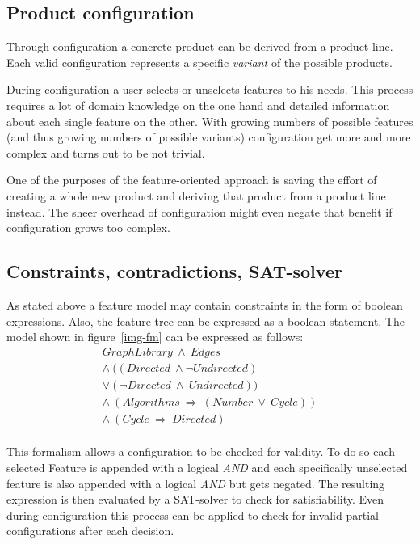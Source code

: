 \subsection{Product configuration}
Through configuration a concrete product can be derived from a product line. Each valid configuration represents a specific \textit{variant} of the possible products.

During configuration a user selects or unselects features to his needs. This process requires a lot of domain knowledge on the one hand and detailed information about each single feature on the other. With growing numbers of possible features (and thus growing numbers of possible variants) configuration get more and more complex and turns out to be not trivial.

One of the purposes of the feature-oriented approach is saving the effort of creating a whole new product and deriving that product from a product line instead. The sheer overhead of configuration might even negate that benefit if configuration grows too complex.

\subsection{Constraints, contradictions, SAT-solver}
As stated above a feature model may contain constraints in the form of boolean expressions. Also, the feature-tree can be expressed as a boolean statement. The model shown in figure~\ref{img-fm} can be expressed as follows:
\begin{equation}
\begin{split}
	GraphLibrary\ \wedge\ Edges\\
	\wedge\ ((Directed\ \wedge \neg Undirected)\\
	\vee (\neg Directed\ \wedge\ Undirected))\\
	\wedge\ (Algorithms\ \Rightarrow\ (Number\ \vee\ Cycle))\\
	\wedge\ (Cycle\ \Rightarrow\ Directed)
\end{split}
\end{equation}\\
This formalism allows a configuration to be checked for validity. To do so each selected Feature is appended with a logical \textit{AND} and each specifically unselected feature is also appended with a logical \textit{AND} but gets negated. The resulting expression is then evaluated by a SAT-solver to check for satisfiability. Even during configuration this process can be applied to check for invalid partial configurations after each decision.
